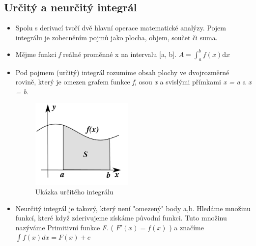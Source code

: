 \documentclass[10pt,a4paper]{article}
\begin{document}
\subsection{Určitý a neurčitý integrál}
\begin{itemize}
\item Spolu s derivací tvoří dvě hlavní operace matematické analýzy. Pojem integrálu je zobecněním pojmů jako plocha, objem, součet či suma.
\item Mějme funkci \textit{f} reálné proměnné x na intervalu [a, b]. $\displaystyle A = \int_a^b f(x) \mathrm{d}x$
\item Pod pojmem (určitý) integrál rozumíme obsah plochy ve dvojrozměrné rovině, který je omezen grafem funkce \textit{f}, osou \textit{x} a svislými přímkami \textit{x = a} a \textit{x = b}.
\begin{figure}[ht]
    \centering
    \includegraphics[width = 5cm]{Integral_as_region_under_curve.pdf}
    \caption{Ukázka určitého integrálu}
    \label{fig:Integral_as_region_under_curve}
\end{figure}
\item Neurčitý integrál je takový, který není "omezený" body a,b. Hledáme množinu funkcí, které když zderivujeme získáme původní funkci. Tuto množinu nazýváme Primitivní funkce \textit{F}. ( $\displaystyle F'(x) = f(x)$ ) a značíme $\displaystyle \int f(x)dx = F(x)+c$ 
\end{itemize}
\end{document}

